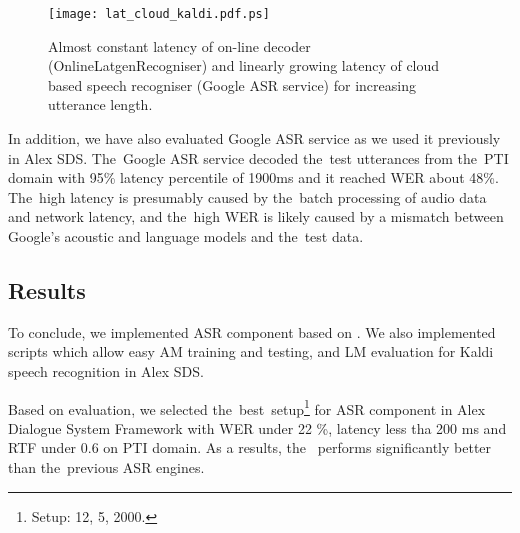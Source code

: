 \begin{figure*}[t]
    \begin{center}
    \texttt{[image: lat\_cloud\_kaldi.pdf.ps]}
    \caption{Almost constant latency of on-line decoder (OnlineLatgenRecogniser) and linearly growing latency of cloud based speech recogniser (Google ASR service) for increasing utterance length.}
    \label{fig:wer} 
    \end{center}
\end{figure*}

In addition, we have also evaluated Google ASR service as we used it previously in Alex \ac{SDS}.
The~Google ASR service decoded the~test utterances from the~PTI domain with 95\% latency percentile of 1900ms and it reached WER about 48\%.
The~high latency is presumably caused by the~batch processing of audio data and network latency, and the~high WER is likely caused by a mismatch between Google's acoustic and language models and the~test data.

\subsection*{Results}
\label{sec:results}

To conclude, we implemented \ac{ASR} component based on .
We also implemented scripts which allow easy \ac{AM} training and testing, and \ac{LM} evaluation for Kaldi speech recognition in Alex \ac{SDS}.

Based on evaluation, we selected the~best~setup\footnote{Setup:  12,  5,  2000.} for ASR component in Alex Dialogue System Framework with  WER under 22 \%, latency less tha 200 ms and RTF under 0.6 on \ac{PTI} domain.
As a results, the~ performs significantly better than the~previous \ac{ASR} engines.
